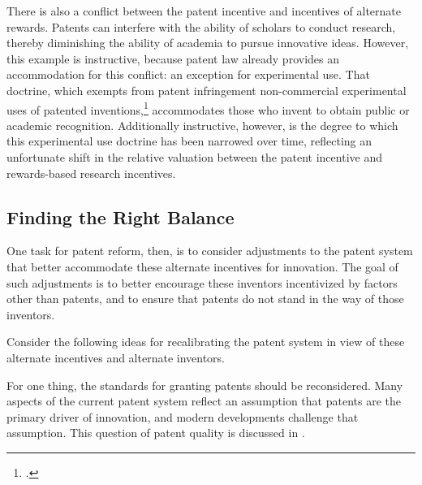 \documentclass[11pt,twocolumn,titlepage]{article}
\begin{document}
There is also a conflict between the patent incentive and incentives of
alternate rewards. Patents can interfere with the ability of scholars to conduct
research, thereby diminishing the ability of academia to pursue innovative
ideas. However, this example is instructive, because patent law already
provides an accommodation for this conflict: an exception for experimental use.
That doctrine, which exempts from patent infringement non-commercial
experimental uses of patented inventions,\footnote{.}
accommodates those who invent to
obtain public or academic recognition. Additionally instructive, however, is
the degree to which this experimental use doctrine has been narrowed over
time,
reflecting an unfortunate shift in the relative valuation
between the patent incentive and rewards-based research incentives.

\subsection{Finding the Right Balance}
\SectionNote

One task for patent reform, then, is to consider
adjustments to the patent system that better accommodate these alternate
incentives for innovation. The goal of such adjustments is to better encourage
these inventors incentivized by factors other than patents, and to ensure that
patents do not stand in the way of those inventors.

Consider the following ideas for recalibrating the patent system in view of
these alternate incentives and alternate inventors.

For one thing, the standards for granting patents should be reconsidered. Many
aspects of the current patent system reflect an assumption that patents are the
primary driver of innovation, and modern developments challenge that assumption.
This question of patent quality is discussed in .
\end{document}
